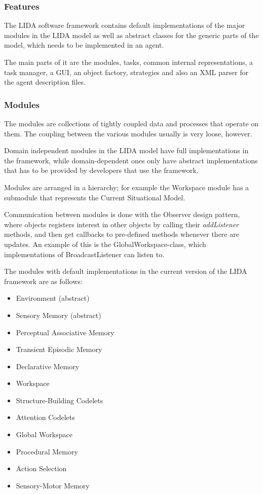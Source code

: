 \subsubsection{Features}
The LIDA software framework contains default implementations of the major modules in the LIDA model as well as abstract classes for the generic parts of the model, which needs to be implemented in an agent.

The main parts of it are the modules, tasks, common internal representations, a task manager, a GUI, an object factory, strategies and also an XML parser for the agent description files.\cite{snaider2012lida}

\subsubsection{Modules}
The modules are collections of tightly coupled data and processes that operate on them. The coupling between the various modules usually is very loose, however.

Domain independent modules in the LIDA model have full implementations in the framework, while domain-dependent ones only have abstract implementations that has to be provided by developers that use the framework.

Modules are arranged in a hierarchy; for example the Workspace module has a submodule that represents the Current Situational Model.

Communication between modules is done with the Observer design pattern, where objects registers interest in other objects by calling their {\em addListener} methods, and then get callbacks to pre-defined methods whenever there are updates. An example of this is the GlobalWorkspace-class, which implementations of BroadcastListener can listen to.

The modules with default implementations in the current version of the LIDA framework are as follows:\cite{snaider2012lida}
\begin{itemize}
 \item Environment (abstract)
 \item Sensory Memory (abstract)
 \item Perceptual Associative Memory
 \item Transient Episodic Memory
 \item Declarative Memory
 \item Workspace
 \item Structure-Building Codelets
 \item Attention Codelets
 \item Global Workspace
 \item Procedural Memory
 \item Action Selection
 \item Sensory-Motor Memory
\end{itemize}

